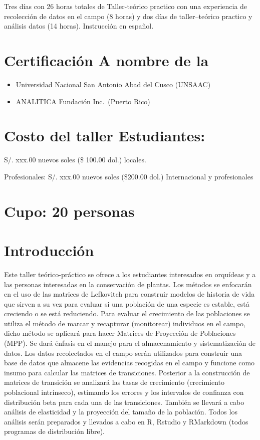 \documentclass[
]{book}
\theoremstyle{definition}
\theoremstyle{definition}
\theoremstyle{definition}
\theoremstyle{definition}
\theoremstyle{remark}
\begin{document}
Tres días con 26 horas totales de Taller-teórico practico con una
experiencia de recolección de datos en el campo (8 horas) y dos días de
taller--teórico practico y análisis datos (14 horas). Instrucción en
español.

\hypertarget{certificaciuxf3n-a-nombre-de-la}{%
\section{Certificación A nombre de la}\label{certificaciuxf3n-a-nombre-de-la}}

\begin{itemize}
\item
  Universidad Nacional San Antonio Abad del Cusco (UNSAAC)
\item
  ANALITICA Fundación Inc.~(Puerto Rico)
\end{itemize}

\hypertarget{costo-del-taller-estudiantes}{%
\section{Costo del taller Estudiantes:}\label{costo-del-taller-estudiantes}}

S/. xxx.00 nuevos soles (\$ 100.00 dol.) locales.

Profesionales: S/. xxx.00 nuevos soles (\$200.00 dol.) Internacional y
profesionales

\hypertarget{cupo-20-personas}{%
\section{Cupo: 20 personas}\label{cupo-20-personas}}

\hypertarget{introducciuxf3n}{%
\section{Introducción}\label{introducciuxf3n}}

Este taller teórico-práctico se ofrece a los estudiantes interesados en
orquídeas y a las personas interesadas en la conservación de plantas.
Los métodos se enfocarán en el uso de las matrices de Lefkovitch para
construir modelos de historia de vida que sirven a su vez para evaluar
si una población de una especie es estable, está creciendo o se está
reduciendo. Para evaluar el crecimiento de las poblaciones se utiliza el
método de marcar y recapturar (monitorear) individuos en el campo, dicho
método se aplicará para hacer Matrices de Proyección de Poblaciones
(MPP). Se dará énfasis en el manejo para el almacenamiento y
sistematización de datos. Los datos recolectados en el campo serán
utilizados para construir una base de datos que almacene las evidencias
recogidas en el campo y funcione como insumo para calcular las matrices
de transiciones. Posterior a la construcción de matrices de transición
se analizará las tasas de crecimiento (crecimiento poblacional
intrínseco), estimando los errores y los intervalos de confianza con
distribución beta para cada una de las transiciones. También se llevará
a cabo análisis de elasticidad y la proyección del tamaño de la
población. Todos los análisis serán preparados y llevados a cabo en R,
Rstudio y RMarkdown (todos programas de distribución libre).
\end{document}
